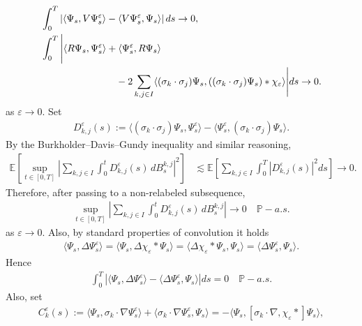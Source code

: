 \documentclass[a4paper,10pt]{amsart}
\renewcommand{\epsilon}{\varepsilon}
\theoremstyle{remark}
\numberwithin{equation}{section}
\begin{document}
\begin{align}\label{convergence_det_order_0_1}
    &\int_0^T \left|\langle \Psi_s,V\Psi^{\epsilon}_s\rangle
    -\langle V\Psi^{\epsilon}_s,\Psi_s\rangle\right|ds\rightarrow 0,\\
    &\int_0^T \Bigg|\langle R\Psi_s,\Psi^{\epsilon}_s\rangle
    +\langle \Psi^{\epsilon}_s,R\Psi_s\rangle\notag\\
    &\hspace{27mm}
    -2\sum_{k,j\in I}\langle(\sigma_k\cdot\sigma_j)\Psi_s,
    ((\sigma_k\cdot\sigma_j)\Psi_s)\ast\chi_{\epsilon}\rangle
    \Bigg|ds\rightarrow0.
    \label{convergence_det_order_0_2}
\end{align}
as $\epsilon\rightarrow 0$.
Set
\begin{align*}
    D^{\epsilon}_{k,j}(s)
    :=\langle(\sigma_k\cdot\sigma_j)\Psi_s,\Psi^{\epsilon}_s\rangle
    -\langle \Psi^{\epsilon}_s,(\sigma_k\cdot\sigma_j)\Psi_s\rangle.
\end{align*}
By the Burkholder--Davis--Gundy inequality and similar reasoning,
\begin{align*}
    \mathbb{E}\left[\sup_{t\in[0,T]}
    \left|\sum_{k,j\in I}\int_0^t
    D^{\epsilon}_{k,j}(s)\,dB^{k,j}_s\right|^2\right]
    &\lesssim
    \mathbb{E}\left[\sum_{k,j\in I}\int_0^T
    |D^{\epsilon}_{k,j}(s)|^2ds\right]\rightarrow0.
\end{align*}
Therefore, after passing to a non-relabeled subsequence,
\begin{align}\label{convergence_stoch_order_0}
    \sup_{t\in[0,T]}
    \left|\sum_{k,j\in I}\int_0^t
    D^{\epsilon}_{k,j}(s)\,dB^{k,j}_s\right|
    \rightarrow0\quad\mathbb{P}-a.s.
\end{align}
as $\epsilon\rightarrow 0$.
Also, by standard properties of convolution it holds
\begin{align*}
    \langle \Psi_s,\Delta\Psi^{\epsilon}_s\rangle
    =\langle \Psi_s,\Delta\chi_{\epsilon}\ast\Psi_s\rangle
    =\langle \Delta\chi_{\epsilon}\ast\Psi_s,\Psi_s\rangle
    =\langle\Delta\Psi^{\epsilon}_s,\Psi_s\rangle.
\end{align*}
Hence
\begin{align}\label{convergence_det_order_2_1}
    \int_0^T |\langle \Psi_s, \Delta\Psi^{\epsilon}_s\rangle- \langle  \Delta\Psi^{\epsilon}_s,\Psi_s\rangle| ds = 0\quad\mathbb{P}-a.s.
\end{align}
Also, set
\begin{align*}
    C_k^\epsilon(s)
    :=\langle \Psi_s,\sigma_k\cdot\nabla\Psi^{\epsilon}_s\rangle
    +\langle\sigma_k\cdot\nabla\Psi^{\epsilon}_s,\Psi_s\rangle
    =-\langle\Psi_s,
    [\sigma_k\cdot\nabla,\chi_{\epsilon}\ast]\Psi_s\rangle,
\end{align*}
\end{document}
